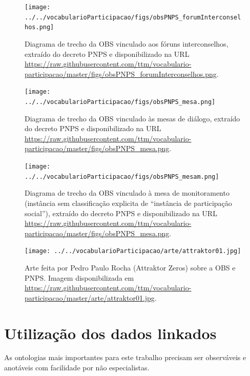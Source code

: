 \documentclass[12pt]{article}
\begin{document}
\begin{figure}[h!]
  \centering
    \texttt{[image: ../../vocabularioParticipacao/figs/obsPNPS\_forumInterconselhos.png]}
  \caption{Diagrama de trecho da OBS vinculado aos fóruns interconselhos, extraído do decreto PNPS e disponibilizado na URL \url{https://raw.githubusercontent.com/ttm/vocabulario-participacao/master/figs/obsPNPS_forumInterconselhos.png}.}\label{fig:4}
\end{figure}


\begin{figure}[h!]
  \centering
    \texttt{[image: ../../vocabularioParticipacao/figs/obsPNPS\_mesa.png]}
  \caption{Diagrama de trecho da OBS vinculado às mesas de diálogo, extraído do decreto PNPS e disponibilizado na URL \url{https://raw.githubusercontent.com/ttm/vocabulario-participacao/master/figs/obsPNPS_mesa.png}.}\label{fig:5}
\end{figure}


\begin{figure}[h!]
  \centering
    \texttt{[image: ../../vocabularioParticipacao/figs/obsPNPS\_mesam.png]}
  \caption{Diagrama de trecho da OBS vinculado à mesa de monitoramento (instância sem classificação explicita de ``instância de participação social''), extraído do decreto PNPS e disponibilizado na URL \url{https://raw.githubusercontent.com/ttm/vocabulario-participacao/master/figs/obsPNPS_mesa.png}.}\label{fig:6}
\end{figure}

\begin{figure}[h!]
  \centering
    \texttt{[image: ../../vocabularioParticipacao/arte/attraktor01.jpg]}
  \caption{Arte feita por Pedro Paulo Rocha (Attraktor Zeros) sobre a OBS e PNPS. Imagem disponibilizada em \url{https://raw.githubusercontent.com/ttm/vocabulario-participacao/master/arte/attraktor01.jpg}.}\label{fig:7}
\end{figure}

\newpage
\section{Utilização dos dados linkados}\label{ap:ut}

As ontologias mais importantes para este trabalho precisam ser observáveis e anotáveis com facilidade por não especialistas.
\end{document}
